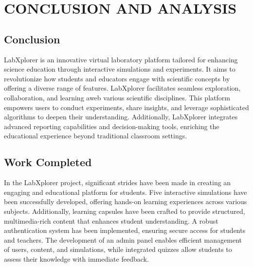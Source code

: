 \chapter{CONCLUSION AND ANALYSIS}
\section{Conclusion}
LabXplorer is an innovative virtual laboratory platform tailored for enhancing science education through interactive simulations and experiments. It aims to revolutionize how students and educators engage with scientific concepts by offering a diverse range of features. LabXplorer facilitates seamless exploration, collaboration, and learning aweb various scientific disciplines. This platform empowers users to conduct experiments, share insights, and leverage sophisticated algorithms to deepen their understanding. Additionally, LabXplorer integrates advanced reporting capabilities and decision-making tools, enriching the educational experience beyond traditional classroom settings.
\section{Work Completed}
In the LabXplorer project, significant strides have been made in creating an engaging and educational platform for students. Five interactive simulations have been successfully developed, offering hands-on learning experiences across various subjects. Additionally, learning capsules have been crafted to provide structured, multimedia-rich content that enhances student understanding. A robust authentication system has been implemented, ensuring secure access for students and teachers. The development of an admin panel enables efficient management of users, content, and simulations, while integrated quizzes allow students to assess their knowledge with immediate feedback.

